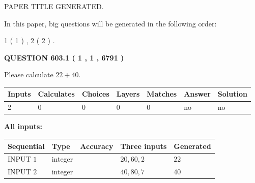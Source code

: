 \documentclass[12pt]{article}
\begin{document}
   
\vspace{0.2in}
   
   
   
   
   
   
   
   
 \vspace{0.2in}
 
 
 
 
   
   
 PAPER TITLE GENERATED.
   
   
   
\vspace{0.2in}
   
In this paper, big questions will be generated in the following order: 
   
   
   1 ( 1 )
 ,
   2 ( 2 )
 .
  
\vspace{0.2in}
  
{\textbf{\Large{QUESTION
603.1 
 ( 1 , 1 , 6791 )
}}}
  
  
 
Please calculate $ %
22 +  %
40 $.
 
 
   
   
   
   
\noindent\begin{tabular}{|l|l|l|l|l|l|l|}
 \hline
Inputs & Calculates & Choices & Layers & Matches & Answer & Solution \\ \hline
 2  & 
 0  & 
 0
  & 
 0  & 
 0  & 
  no & 
  no 
  \\ \hline
 \end{tabular}
   
   
   
   
\noindent{}
   
   
   
   
\noindent\vspace{0.1in}\hspace{-0.08in} {\textbf{\Large{All inputs: }}}
   
   
  
  
\noindent\begin{tabular}{|l|l|l|l|l|}
\hline
 Sequential & Type & Accuracy & Three inputs & Generated \\ 
\hline
 
 
  INPUT $  1 $ & integer &  & $
 20
 , 
 60
 , 
 2
 $ & $ 22 $ 
 \\  \hline  
 
 
  INPUT $  2 $ & integer &  & $
 40
 , 
 80
 , 
 7
 $ & $ 40 $ 
 \\  \hline  
 \end{tabular}
   
\end{document}
